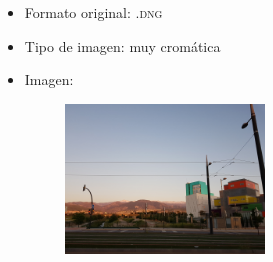 \documentclass[11pt,a4paper]{article}
\begin{document}
\begin{itemize}
	\item Formato original: \textsc{.dng}
	\item Tipo de imagen: muy cromática
	\item Imagen:
		\begin{figure}[H]
		\centering
			\includegraphics[width=0.5\textwidth]{Fotos/crom.jpg}
		\end{figure}	
\end{itemize}
\end{document}
